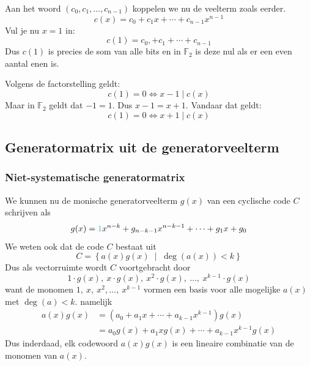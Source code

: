 Aan het woord $(c_0, c_1, \dots, c_{n-1})$ koppelen we nu de veelterm zoals eerder.
\begin{equation*}
    c(x) = c_0 + c_1x + \cdots + c_{n-1}x^{n-1}
\end{equation*}
Vul je nu $x=1$ in:
\begin{equation*}
    c(1) = c_0, + c_1 + \cdots + c_{n-1}
\end{equation*}
Dus $c(1)$ is precies de som van alle bits en in $\mathbb{F}_2$ is deze nul als er een even aantal enen is.

Volgens de factorstelling geldt:
\begin{equation*}
    c(1) = 0 \iff x-1 \mid c(x)
\end{equation*}
Maar in $\mathbb{F}_2$ geldt dat $-1=1$. Dus $x-1 = x+1$.
Vandaar dat geldt:
\begin{equation*}
    c(1) = 0 \iff x+1 \mid c(x)
\end{equation*}

\subsection{Generatormatrix uit de generatorveelterm}

\subsubsection{Niet-systematische generatormatrix}

We kunnen nu de monische generatorveelterm $g(x)$ van een cyclische code $C$ schrijven als
\begin{equation*}
    g(x) = \textcolor{Aquamarine}{1}x^{n-k} + g_{n-k-1}x^{n-k-1} + \cdots + g_1x + g_0
\end{equation*}
We weten ook dat de code $C$ bestaat uit
\begin{equation*}
    C = \left\{ a(x)g(x) \;\mid\; \deg(a(x)) < k \right\}
\end{equation*}
Dus als vectorruimte wordt $C$ voortgebracht door
\begin{equation*}
    1\cdot g(x),\ x\cdot g(x),\ x^2\cdot g(x),\ \dots,\ x^{k-1}\cdot g(x)
\end{equation*}
want de monomen $1,\ x,\ x^2, \dots,\ x^{k-1}$ vormen een basis voor alle mogelijke $a(x)$ met $\deg(a)<k$. namelijk
\begin{equation*}
    \begin{aligned}
        a(x)g(x) &= (a_0 + a_1x + \cdots + a_{k-1}x^{k-1})g(x) \\
                 &= a_0g(x) + a_1xg(x) + \cdots + a_{k-1}x^{k-1}g(x)
    \end{aligned}
\end{equation*}
Dus inderdaad, elk codewoord $a(x)g(x)$ is een lineaire combinatie van de monomen van $a(x)$.

